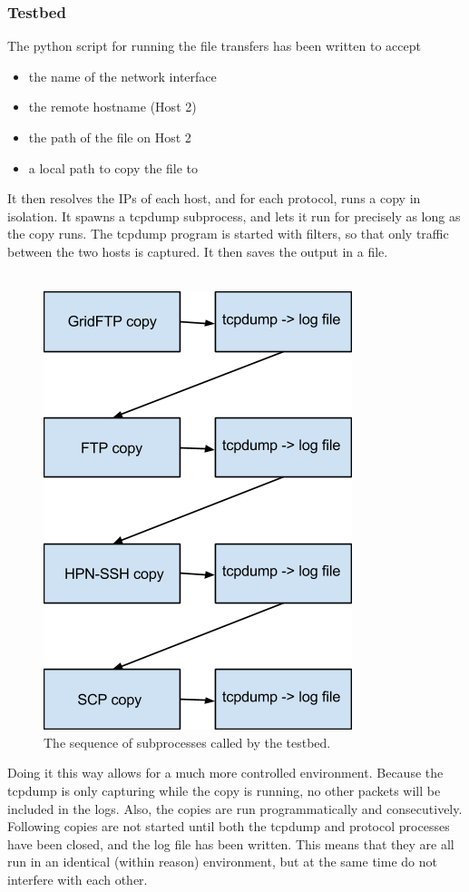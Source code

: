 \documentclass{sig-alternate-05-2015}
\begin{document}
\subsubsection{Testbed}
The python script for running the file transfers has been written to accept
\begin{itemize}
	\item the name of the network interface
	\item the remote hostname (Host 2)
	\item the path of the file on Host 2
	\item a local path to copy the file to
\end{itemize}

It then resolves the IPs of each host, and for each protocol, runs a copy in isolation. It spawns a tcpdump subprocess, and lets it run for precisely as long as the copy runs. The tcpdump program is started with filters, so that only traffic between the two hosts is captured. It then saves the output in a file.\\\\
\begin{figure}[H]
	\label{fig:testbed_sequence}
	\centering
	\includegraphics[height=0.5\textheight]{img/seq_example}
	\caption{The sequence of subprocesses called by the testbed.}
\end{figure}
Doing it this way allows for a much more controlled environment. Because the tcpdump is only capturing while the copy is running, no other packets will be included in the logs. Also, the copies are run programmatically and consecutively. Following copies are not started until both the tcpdump and protocol processes have been closed, and the log file has been written. This means that they are all run in an identical (within reason) environment, but at the same time do not interfere with each other.\\\\
\end{document}
